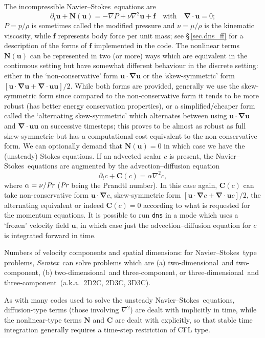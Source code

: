 \documentclass[11pt]{report}
\def\Pr{\mbox{\it Pr}}                              %
\newcommand{\Semtex}{\emph{Semtex}} \newcommand{\Dog}{\emph{Dog}}
\newcommand\twod{two-di\-men\-sion\-al}
\newcommand\threed{three-di\-men\-sion\-al}
\newcommand\twoc{two-com\-po\-nent}
\newcommand\threec{three-com\-po\-nent}
\newcommand\NavSto{Navier--Stokes}
\begin{document}
The incompressible \NavSto\ equations are
\begin{equation}
\partial_t\bm{u}+\bm{N}(\bm{u}) = -\nabla P + \nu\nabla^2\bm{u} + \bm{f}
\quad\text{with}\quad
\bm{\nabla\cdot u} = 0;
\label{eq.navsto}
\end{equation}
$P=p/\rho$ is sometimes called the modified pressure and
$\nu=\mu/\rho$ is the kinematic viscosity, while $\bm{f}$ represents
body force per unit mass; see \S\,\ref{sec.dns_ff} for a description
of the forms of $\bm{f}$ implemented in the code.  The nonlinear terms
$\bm{N}(\bm{u})$ can be represented in two (or more) ways which are
equivalent in the continuous setting but have somewhat different
behaviour in the discrete setting: either in the `non-conservative'
form $\bm{u\cdot\nabla u}$ or the `skew-symmetric' form
$[\bm{u\cdot\nabla u} + \bm{\nabla\cdot uu}]/2$.
%
While both forms are provided, generally we use the skew-symmetric
form since compared to the non-conservative form it tends to be more
robust (has better energy conservation properties), or a
simplified/cheaper form called the `alternating skew-symmetric' which
alternates between using $\bm{u\cdot\nabla u}$ and $\bm{\nabla\cdot
  uu}$ on successive timesteps; this proves to be almost as robust as
full skew-symmetric but has a computational cost equivalent to the
non-conservative form.  We can optionally demand that $\bm{N}(\bm{u})
= 0$ in which case we have the (unsteady) Stokes equations.
%
If an advected scalar $c$ is present, the \NavSto\ equations are
augmented by the advection--diffusion equation
\begin{equation}
  \partial_t c + \bm{C}(c) = \alpha\nabla^2 c,
  \label{eq.advectdiff}
\end{equation}
where $\alpha = \nu/\Pr$ ($\Pr$ being the Prandtl number).  In this
case again, $\bm{C}(c)$ can take non-conservative form
$\bm{u\cdot\nabla}c$, skew-symmetric form $[\bm{u\cdot\nabla}c +
  \bm{\nabla\cdot u}c]/2$, the alternating equivalent or indeed
$\bm{C}(c)=0$ according to what is requested for the momentum
equations.  It is possible to run \verb|dns| in a mode which uses a
`frozen' velocity field $\bm{u}$, in which case just the
advection--diffusion equation for $c$ is integrated forward in time.

Numbers of velocity components and spatial dimensions: for
\NavSto\ type problems, \Semtex\ can solve problems which are (a)
\twod\ and \twoc, (b) \twod\ and \threec, or \threed\ and
\threec\ (a.k.a.\ 2D2C, 2D3C, 3D3C).

As with many codes used to solve the unsteady \NavSto\ equations,
diffusion-type terms (those involving $\nabla^2$) are dealt with
implicitly in time, while the nonlinear-type terms $\bm{N}$ and
$\bm{C}$ are dealt with explicitly, so that stable time integration
generally requires a time-step restriction of CFL type.
\end{document}
